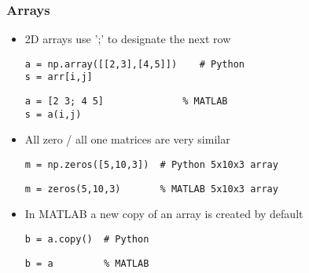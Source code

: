 \documentclass[english,14pt]{beamer}
\begin{document}
\begin{frame}[fragile]

\frametitle{Arrays}

	\begin{itemize}
		\item 2D arrays use ';' to designate the next row
		
		\begin{lstlisting}[style=CStyle]
a = np.array([[2,3],[4,5]])    # Python
s = arr[i,j]
\end{lstlisting}
\begin{lstlisting}[style=MStyle]
a = [2 3; 4 5]              % MATLAB
s = a(i,j)
\end{lstlisting}

		\item All zero / all one matrices are very similar
		
		\begin{lstlisting}[style=CStyle]
m = np.zeros([5,10,3])  # Python 5x10x3 array
\end{lstlisting}
\begin{lstlisting}[style=MStyle]
m = zeros(5,10,3)       % MATLAB 5x10x3 array
\end{lstlisting}

	      \item In MATLAB a new copy of an array is created by default
	      
\begin{lstlisting}[style=CStyle]
b = a.copy()  # Python
\end{lstlisting}
\begin{lstlisting}[style=MStyle]
b = a         % MATLAB
\end{lstlisting}

	\end{itemize}

\end{frame}

\end{document}
